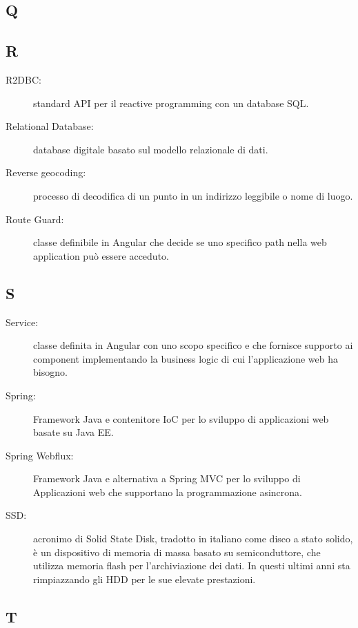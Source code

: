 \documentclass[../manuale-manutentore.tex]{subfiles}
\begin{document}
\subsection{Q}

\subsection{R}

\begin{description}
    \item[R2DBC:] standard API per il reactive programming con un database SQL\@.
    \item[Relational Database:] database digitale basato sul modello relazionale di dati.
    \item[Reverse geocoding:] processo di decodifica di un punto in un indirizzo leggibile o nome di luogo.
    \item[Route Guard:] classe definibile in Angular che decide se uno specifico path nella web application può essere acceduto.
\end{description}

\subsection{S}

\begin{description}
    \item[Service:] classe definita in Angular con uno scopo specifico e che fornisce supporto ai component implementando la business logic di cui l'applicazione web ha bisogno.
    \item[Spring:] Framework Java e contenitore IoC per lo sviluppo di applicazioni web basate su Java EE\@.
    \item[Spring Webflux:] Framework Java e alternativa a Spring MVC per lo sviluppo di Applicazioni web che supportano la programmazione asincrona.
    \item[SSD:] acronimo di Solid State Disk, tradotto in italiano come disco a stato solido, è un dispositivo di memoria di massa basato su semiconduttore, che utilizza memoria flash per l'archiviazione dei dati. In questi ultimi anni sta rimpiazzando gli HDD per le sue elevate prestazioni.
\end{description}

\subsection{T}
\end{document}
